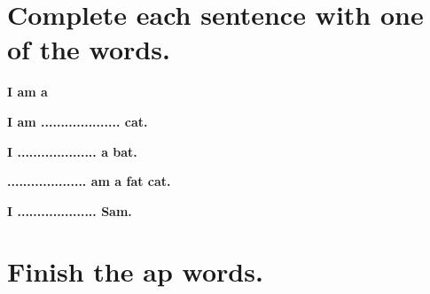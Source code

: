 \documentclass[a4paper, 12pt]{book}
\begin{document}
    \section{Complete each sentence with one of the words.}
    
    \begin{center}
        \textbf{\Huge{I \hspace{0.8cm} am \hspace{0.8cm} a}}
    \end{center}
    \vspace{6mm} %
    \begin{flushleft}
        \textbf{\Huge {I am .................... cat. }}
        \vspace{10mm}
    \begin{flushleft}
        \textbf{\Huge {I .................... a bat. }}
        \vspace{10mm}
    \begin{flushleft}
        \textbf{\Huge {.................... am a fat cat. }}
        \vspace{10mm}
    \begin{flushleft}
        \textbf{\Huge {I .................... Sam. }}
    \end{flushleft}

    \vspace{5mm} %
    \section{Finish the \textbf{ap words}. }
    
   
    

\end{flushleft}
\end{flushleft}
\end{flushleft}
\end{document}

